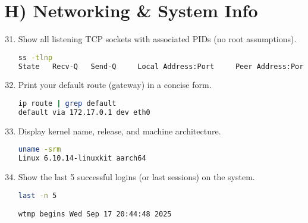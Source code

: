 \section*{H) Networking \& System Info}
\begin{enumerate}
\setcounter{enumi}{30}
\item Show all listening TCP sockets with associated PIDs (no root assumptions). \vspace{2em}\\
\begin{lstlisting}[language=sh]
ss -tlnp
State   Recv-Q   Send-Q     Local Address:Port     Peer Address:Port  Process
\end{lstlisting}
\item Print your default route (gateway) in a concise form. \vspace{2em}\\
\begin{lstlisting}[language=sh]
ip route | grep default
default via 172.17.0.1 dev eth0 
\end{lstlisting}
\item Display kernel name, release, and machine architecture. \vspace{2em}\\
\begin{lstlisting}[language=sh]
uname -srm
Linux 6.10.14-linuxkit aarch64
\end{lstlisting}
\item Show the last 5 successful logins (or last sessions) on the system. \vspace{2em}\\
\begin{lstlisting}[language=sh]
last -n 5

wtmp begins Wed Sep 17 20:44:48 2025
\end{lstlisting}
\end{enumerate}

